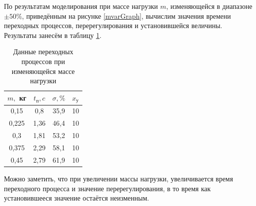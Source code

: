 \documentclass[fleqn, a4paper, 11pt, russian]{article}
\begin{document}
	\newpage
	По результатам моделирования при массе нагрузки $m$, изменяющейся в диапазоне $\pm50\%$, приведённым на рисунке \ref{mvarGraph}, вычислим значения времени переходных процессов, перерегулирования и установившейся величины. Результаты занесём в таблицу \ref{mvarTab}.
	\begin{table}[ht!]
		\centering
		\begin{threeparttable}
			\caption{Данные переходных процессов при изменяющейся массе нагрузки}
			\begin{tabular}{|c|c|c|c|}
				\hline
				$m,$ кг	& $t_\text{п}, c$	& $\sigma, \%$	& $x_\text{у}$\\\hline
				0,15	& 0,8				& 35,9			& 10\\\hline
				0,225	& 1,36				& 46,4			& 10\\\hline
				0,3		& 1,81				& 53,2			& 10\\\hline
				0,375	& 2,29				& 58,1			& 10\\\hline
				0,45	& 2,79				& 61,9			& 10\\\hline
			\end{tabular}
		\end{threeparttable}
		\label{mvarTab}
	\end{table}
	
	Можно заметить, что при увеличении массы нагрузки, увеличивается время переходного процесса и значение перерегулирования, в то время как установившееся значение остаётся неизменным.
	\clearpage
\end{document}
